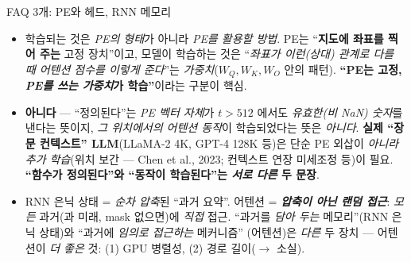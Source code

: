 \documentclass[aspectratio=169,11pt]{beamer}
\begin{document}
\begin{frame}{FAQ 3개: PE와 헤드, RNN 메모리}
  \begin{itemize}
    \item {} 학습되는 것은 \emph{PE의 형태}가 아니라
      \emph{PE를 \emph{활용}할 방법}. PE는 ``\textbf{지도에
      좌표를 찍어 주는} 고정 장치''이고, 모델이 학습하는 것은
      ``\emph{좌표가 이런(상대) 관계로 다를 때 어텐션 점수를
      이렇게 준다}''는 \emph{가중치}($W_Q, W_K, W_O$ 안의
      패턴). \textbf{``PE는 고정, \emph{PE를 쓰는 가중치}가
      학습''}이라는 구분이 핵심.
    \item {}
      \textbf{아니다} — ``정의된다''는 \emph{PE 벡터 자체}가
      $t>512$ 에서도 \emph{유효한(비 NaN) 숫자}를 낸다는 뜻이지,
      \emph{그 위치에서의 어텐션 동작}이 학습되었다는 뜻은
      \emph{아니다}. \textbf{실제 ``장문 컨텍스트'' LLM}(LLaMA-2
      4K, GPT-4 128K 등)은 단순 PE 외삽이 \emph{아니라}
      \emph{추가 학습}(위치 보간 — Chen et al., 2023; 컨텍스트
      연장 미세조정 등)이 필요. \textbf{``함수가 정의된다''와
      ``동작이 학습된다''는 \emph{서로 다른} 두 문장}.
    \item {}
      RNN 은닉 상태 = \emph{순차 압축}된 ``과거 요약''.
      어텐션 = \emph{\textbf{압축이 아닌 랜덤 접근}}:
      \emph{모든} 과거(과 미래, mask 없으면)에 \emph{직접}
      접근. ``과거를 \emph{담아 두는} 메모리''(RNN 은닉
      상태)와 ``과거에 \emph{임의로 접근하는} 메커니즘''
      (어텐션)은 \emph{다른} 두 장치 — 어텐션이 \emph{더 좋은}
      것: (1) GPU 병렬성, (2) 경로 길이($\to$ 소실).
  \end{itemize}
\end{frame}
\end{document}
